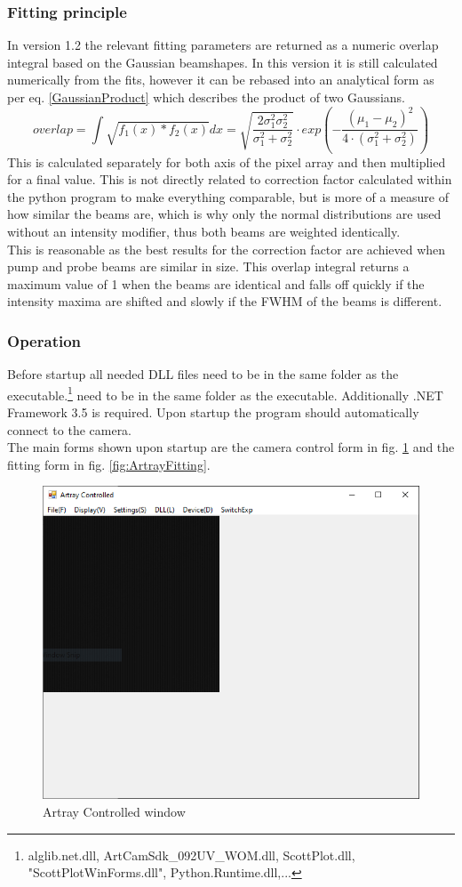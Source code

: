 \documentclass[twoside,openright]{scrreprt}
\begin{document}
\subsubsection{Fitting principle}
In version 1.2 the relevant fitting parameters are returned as a numeric overlap integral based on the Gaussian beamshapes. In this version it is still calculated numerically from the fits, however it can be rebased into an analytical form as per eq. \ref{GaussianProduct} which describes the product of two Gaussians.
\begin{equation}
overlap = \int \sqrt{f_1(x)*f_2(x)}dx =  \sqrt{\frac{2 \sigma_1^2\sigma_2^2}{\sigma_1^2+\sigma_2^2}}\cdot exp\left(-\frac{\left(\mu_1-\mu_2\right)^2}{4\cdot \left(\sigma_1^2 + \sigma_2^2\right)}\right)
\end{equation}
This is calculated separately for both axis of the pixel array and then multiplied for a final value. 
This is not directly related to correction factor calculated within the python program to make everything comparable, but is more of a measure of how similar the beams are, which is why only the normal distributions are used without an intensity modifier, thus both beams are weighted identically. \\
This is reasonable as the best results for the correction factor are achieved when pump and probe beams are similar in size. This overlap integral returns a maximum value of 1 when the beams are identical and falls off quickly if the intensity maxima are shifted and slowly if the FWHM of the beams is different.\\
\subsubsection{Operation}
Before startup all needed DLL files need to be in the same folder as the executable.\footnote{alglib.net.dll, ArtCamSdk\_092UV\_WOM.dll, ScottPlot.dll, "ScottPlotWinForms.dll", Python.Runtime.dll,...} need to be in the same folder as the executable. Additionally .NET Framework 3.5 is required. Upon startup the program should automatically connect to the camera. \\
The main forms shown upon startup are the camera control form in fig. \ref{fig:ArtrayMain} and the fitting form in fig. \ref{fig:ArtrayFitting}.

\begin{figure}[hbtp]
\centering
\includegraphics[width = 0.6\linewidth]{images/ArtrayExamplePics/ArtrayControlledMain.PNG}
\caption{Artray Controlled window\label{fig:ArtrayMain}}
\end{figure}
\end{document}
